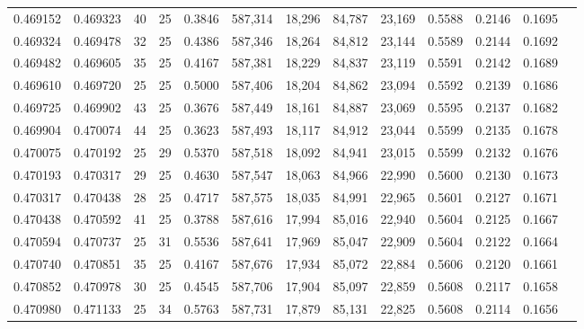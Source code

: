 \begin{tabular}{rrrrrrrrrrrrr}
0.469152 & 0.469323 &    40 &  25 &                                     0.3846 & 587,314 &  18,296 &  84,787 &  23,169 & 0.5588 & 0.2146 & 0.1695 \\
0.469324 & 0.469478 &    32 &  25 &                                     0.4386 & 587,346 &  18,264 &  84,812 &  23,144 & 0.5589 & 0.2144 & 0.1692 \\
0.469482 & 0.469605 &    35 &  25 &                                     0.4167 & 587,381 &  18,229 &  84,837 &  23,119 & 0.5591 & 0.2142 & 0.1689 \\
0.469610 & 0.469720 &    25 &  25 &                                     0.5000 & 587,406 &  18,204 &  84,862 &  23,094 & 0.5592 & 0.2139 & 0.1686 \\
0.469725 & 0.469902 &    43 &  25 &                                     0.3676 & 587,449 &  18,161 &  84,887 &  23,069 & 0.5595 & 0.2137 & 0.1682 \\
0.469904 & 0.470074 &    44 &  25 &                                     0.3623 & 587,493 &  18,117 &  84,912 &  23,044 & 0.5599 & 0.2135 & 0.1678 \\
0.470075 & 0.470192 &    25 &  29 &                                     0.5370 & 587,518 &  18,092 &  84,941 &  23,015 & 0.5599 & 0.2132 & 0.1676 \\
0.470193 & 0.470317 &    29 &  25 &                                     0.4630 & 587,547 &  18,063 &  84,966 &  22,990 & 0.5600 & 0.2130 & 0.1673 \\
0.470317 & 0.470438 &    28 &  25 &                                     0.4717 & 587,575 &  18,035 &  84,991 &  22,965 & 0.5601 & 0.2127 & 0.1671 \\
0.470438 & 0.470592 &    41 &  25 &                                     0.3788 & 587,616 &  17,994 &  85,016 &  22,940 & 0.5604 & 0.2125 & 0.1667 \\
0.470594 & 0.470737 &    25 &  31 &                                     0.5536 & 587,641 &  17,969 &  85,047 &  22,909 & 0.5604 & 0.2122 & 0.1664 \\
0.470740 & 0.470851 &    35 &  25 &                                     0.4167 & 587,676 &  17,934 &  85,072 &  22,884 & 0.5606 & 0.2120 & 0.1661 \\
0.470852 & 0.470978 &    30 &  25 &                                     0.4545 & 587,706 &  17,904 &  85,097 &  22,859 & 0.5608 & 0.2117 & 0.1658 \\
0.470980 & 0.471133 &    25 &  34 &                                     0.5763 & 587,731 &  17,879 &  85,131 &  22,825 & 0.5608 & 0.2114 & 0.1656 \\

\end{tabular}
